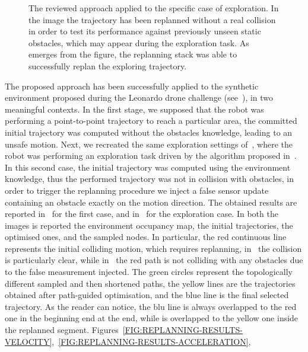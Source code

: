 \begin{figure}[!t]
\begin{center}
\begin{minipage}{.45\linewidth}
		\end{minipage}
	\end{center}
	\caption{The reviewed approach applied to the specific case of exploration. In the image the trajectory has been replanned without a real
    collision in order to test its performance against previously unseen static obstacles, which may appear during the exploration task.
    As emerges from the figure, the replanning stack was able to successfully replan the exploring trajectory.}%
    \label{FIG:REPLANNING-RESULTS-EXPLORATION}
\end{figure}
The proposed approach has been successfully applied to the synthetic environment proposed during the Leonardo drone challenge (see~),
in two meaningful contexts. In the first stage, we supposed that the robot was performing a point-to-point trajectory to reach a particular area,
the committed initial trajectory was computed without the obstacles knowledge, leading to an unsafe motion. Next, we recreated the same 
exploration settings of~, where the robot was performing an exploration task driven by the
algorithm proposed in~. In this second case, the initial trajectory was computed using the
environment knowledge, thus the performed trajectory was not in collision with obstacles, in order to trigger the replanning procedure
we inject a false sensor update containing an obstacle exactly on the motion direction.
The obtained results are reported in~ for the first case, and in~
for the exploration case. In both the images is reported the environment occupancy map, the initial trajectories, the optimised ones, and the sampled nodes.
In particular, the red continuous line represents the initial colliding motion, which requires replanning, in~
the collision is particularly clear, while in~ the red path is not colliding with any obstacles due to the
false measurement injected. The green circles represent the topologically different sampled and then shortened paths, the yellow lines are the 
trajectories obtained after path-guided optimisation, and the blue line is the final selected trajectory.
As the reader can notice, the blu line is always overlapped to the red one in the beginning end at the end, while is overlapped to the
yellow one inside the replanned segment. Figures~\ref{FIG:REPLANNING-RESULTS-VELOCITY},~\ref{FIG:REPLANNING-RESULTS-ACCELERATION},
